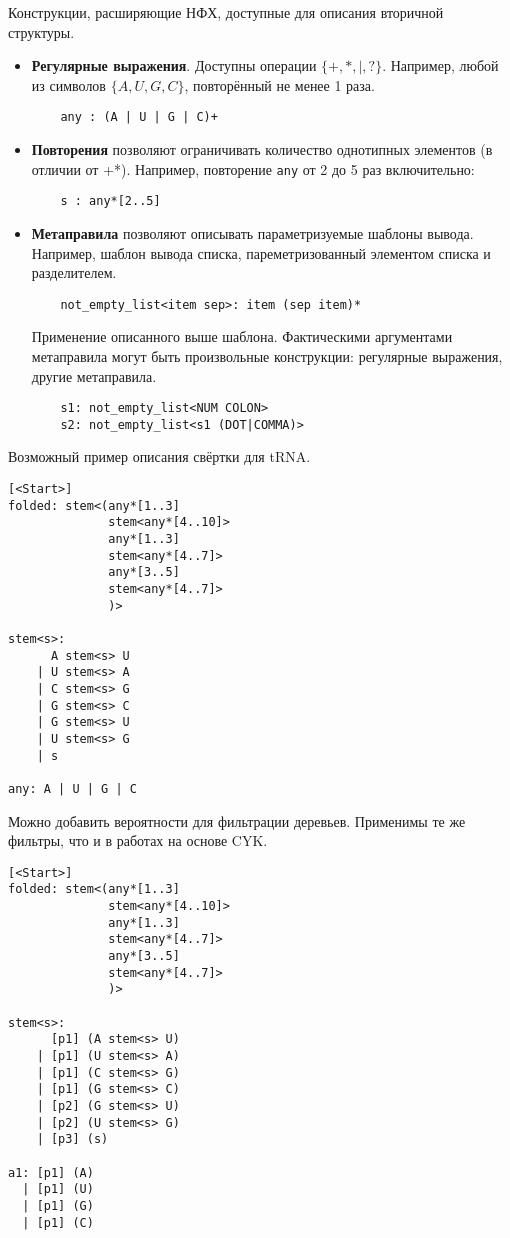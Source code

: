 \documentclass[a5paper]{article}
\begin{document}
Конструкции, расширяющие НФХ, доступные для описания вторичной структуры. 
\begin{itemize}
    \item \textbf{Регулярные выражения}. Доступны операции $\{+,*,|,?\}$. Например, любой из символов 
    $\{A,U,G,C\}$, повторённый не менее 1 раза.
        \begin{verbatim}
    any : (A | U | G | C)+ 
        \end{verbatim}
    \item \textbf{Повторения} позволяют ограничивать количество однотипных элементов (в отличии от +*). Например, повторение \texttt{any} от 2 до 5 раз включительно:
        \begin{verbatim}
    s : any*[2..5] 
        \end{verbatim}
    \item \textbf{Метаправила} позволяют описывать параметризуемые шаблоны вывода. Например, шаблон 
вывода списка, пареметризованный элементом списка и разделителем.
        \begin{verbatim}
    not_empty_list<item sep>: item (sep item)*
        \end{verbatim}
    Применение описанного выше шаблона. Фактическими аргументами метаправила могут быть 
    произвольные конструкции: регулярные выражения, другие метаправила.
        \begin{verbatim}
    s1: not_empty_list<NUM COLON>
    s2: not_empty_list<s1 (DOT|COMMA)>
        \end{verbatim}
\end{itemize}

Возможный пример описания свёртки для tRNA.

\begin{verbatim}
[<Start>]
folded: stem<(any*[1..3] 
              stem<any*[4..10]> 
              any*[1..3] 
              stem<any*[4..7]> 
              any*[3..5] 
              stem<any*[4..7]>
              )>

stem<s>: 
      A stem<s> U
    | U stem<s> A
    | C stem<s> G
    | G stem<s> C
    | G stem<s> U
    | U stem<s> G
    | s

any: A | U | G | C

\end{verbatim}

Можно добавить вероятности для фильтрации деревьев. Применимы те же фильтры, что и в работах на 
основе CYK.

\begin{verbatim}
[<Start>]
folded: stem<(any*[1..3] 
              stem<any*[4..10]> 
              any*[1..3] 
              stem<any*[4..7]> 
              any*[3..5] 
              stem<any*[4..7]>
              )>

stem<s>: 
      [p1] (A stem<s> U)
    | [p1] (U stem<s> A)
    | [p1] (C stem<s> G)
    | [p1] (G stem<s> C)
    | [p2] (G stem<s> U)
    | [p2] (U stem<s> G)
    | [p3] (s)

a1: [p1] (A)
  | [p1] (U)
  | [p1] (G)
  | [p1] (C)
\end{verbatim}
\end{document}
